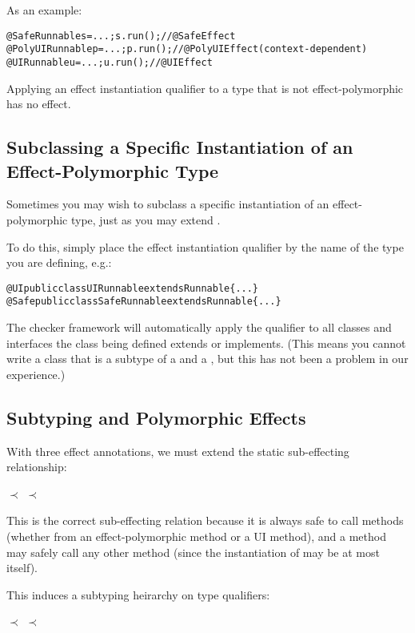 As an example:

\begin{alltt}
@Safe Runnable s = ...;   s.run(); // @SafeEffect
@PolyUI Runnable p = ...; p.run(); // @PolyUIEffect (context-dependent)
@UI Runnable u = ...;     u.run(); // @UIEffect
\end{alltt}

Applying an effect instantiation qualifier to a type that is not effect-polymorphic has no effect.

\subsection{Subclassing a Specific Instantiation of an Effect-Polymorphic Type}
Sometimes you may wish to subclass a specific instantiation of an effect-polymorphic type, just as
you may extend .

To do this, simply place the effect instantiation qualifier by the name of the type you are
defining, e.g.:

\begin{alltt}
@UI public class UIRunnable extends Runnable \{...\}
@Safe public class SafeRunnable extends Runnable \{...\}
\end{alltt}
The checker framework will automatically apply the qualifier to all classes and interfaces the class
being defined extends or implements.  (This means you cannot write a class that is a subtype of a
 and a , but this has not been a problem in our experience.)

\subsection{Subtyping and Polymorphic Effects}
With three effect annotations, we must extend the static sub-effecting relationship:

\centerline{ $\prec$  $\prec$ }

This is the correct sub-effecting relation because it is always safe to call 
methods (whether from an effect-polymorphic method or a UI method), and a  method
may safely call any other method (since the instantiation of  may be at most
 itself).

This induces a subtyping heirarchy on type qualifiers:

\centerline{ $\prec$  $\prec$ }

